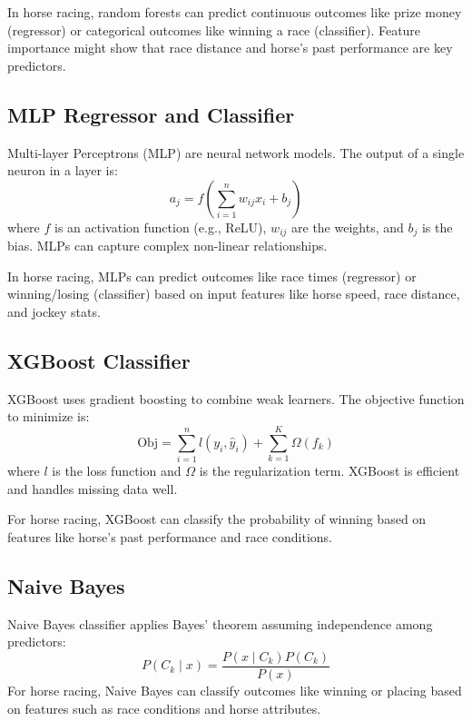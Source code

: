 \documentclass{article}
\begin{document}
In horse racing, random forests can predict continuous outcomes like prize money (regressor) or categorical outcomes like winning a race (classifier). Feature importance might show that race distance and horse's past performance are key predictors.

\subsection*{MLP Regressor and Classifier}
Multi-layer Perceptrons (MLP) are neural network models. The output of a single neuron in a layer is:
\begin{equation}
a_j = f\left(\sum_{i=1}^n w_{ij} x_i + b_j\right)
\end{equation}
where \( f \) is an activation function (e.g., ReLU), \( w_{ij} \) are the weights, and \( b_j \) is the bias. MLPs can capture complex non-linear relationships.

In horse racing, MLPs can predict outcomes like race times (regressor) or winning/losing (classifier) based on input features like horse speed, race distance, and jockey stats.

\subsection*{XGBoost Classifier}
XGBoost uses gradient boosting to combine weak learners. The objective function to minimize is:
\begin{equation}
\text{Obj} = \sum_{i=1}^n l(y_i, \hat{y}_i) + \sum_{k=1}^K \Omega(f_k)
\end{equation}
where \( l \) is the loss function and \( \Omega \) is the regularization term. XGBoost is efficient and handles missing data well.

For horse racing, XGBoost can classify the probability of winning based on features like horse's past performance and race conditions.

\subsection*{Naive Bayes}
Naive Bayes classifier applies Bayes' theorem assuming independence among predictors:
\begin{equation}
P(C_k \mid x) = \frac{P(x \mid C_k) P(C_k)}{P(x)}
\end{equation}
For horse racing, Naive Bayes can classify outcomes like winning or placing based on features such as race conditions and horse attributes.
\end{document}
